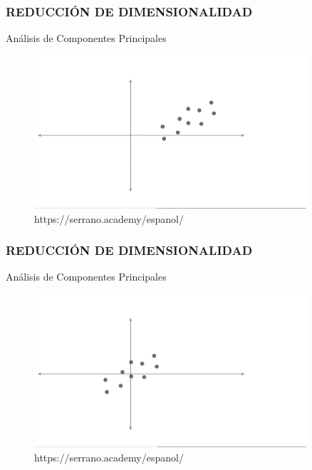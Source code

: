 \documentclass{beamer}
\begin{document}
\begin{frame}
\frametitle{REDUCCIÓN DE DIMENSIONALIDAD}
\begin{block}{Análisis de Componentes Principales}	
	\begin{figure}
		\includegraphics[width=0.9\textwidth]{PCA/IMG_3563.jpg}
		\caption{https://serrano.academy/espanol/}
	\end{figure}
\end{block}
\end{frame}

\begin{frame}
\frametitle{REDUCCIÓN DE DIMENSIONALIDAD}
\begin{block}{Análisis de Componentes Principales}	
	\begin{figure}
		\includegraphics[width=0.9\textwidth]{PCA/IMG_3564.jpg}
		\caption{https://serrano.academy/espanol/}
	\end{figure}
\end{block}
\end{frame}
\end{document}

